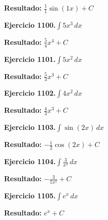 \documentclass[10pt,a4paper]{article}
\begin{document}
\begin{solbox}
\textbf{Resultado:} \(\displaystyle \frac{1}{1}\sin(1x) + C\)
\end{solbox}

\begin{ejbox}
\textbf{Ejercicio 1100.}\quad $\int 5x^{3}\,dx$
\end{ejbox}

\begin{solbox}
\textbf{Resultado:} \(\displaystyle \frac{5}{4}x^{4} + C\)
\end{solbox}

\begin{ejbox}
\textbf{Ejercicio 1101.}\quad $\int 5x^{2}\,dx$
\end{ejbox}

\begin{solbox}
\textbf{Resultado:} \(\displaystyle \frac{5}{3}x^{3} + C\)
\end{solbox}

\newpage
\begin{ejbox}
\textbf{Ejercicio 1102.}\quad $\int 4x^{2}\,dx$
\end{ejbox}

\begin{solbox}
\textbf{Resultado:} \(\displaystyle \frac{4}{3}x^{3} + C\)
\end{solbox}

\begin{ejbox}
\textbf{Ejercicio 1103.}\quad $\int \sin(2x)\,dx$
\end{ejbox}

\begin{solbox}
\textbf{Resultado:} \(\displaystyle -\frac{1}{2}\cos(2x) + C\)
\end{solbox}

\begin{ejbox}
\textbf{Ejercicio 1104.}\quad $\int \frac{3}{x^{2}}\,dx$
\end{ejbox}

\begin{solbox}
\textbf{Resultado:} \(\displaystyle -\frac{3}{1x^{1}} + C\)
\end{solbox}

\newpage
\begin{ejbox}
\textbf{Ejercicio 1105.}\quad $\int e^x\,dx$
\end{ejbox}

\begin{solbox}
\textbf{Resultado:} \(\displaystyle e^x + C\)
\end{solbox}
\end{document}
